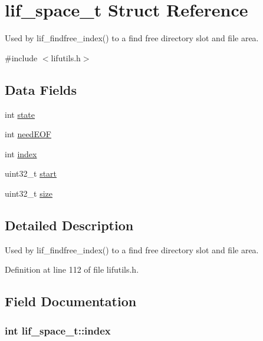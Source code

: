 \hypertarget{structlif__space__t}{}\section{lif\+\_\+space\+\_\+t Struct Reference}
\label{structlif__space__t}


Used by lif\+\_\+findfree\+\_\+index() to a find free directory slot and file area.  




{\ttfamily \#include $<$lifutils.\+h$>$}

\subsection*{Data Fields}
\begin{DoxyCompactItemize}
\item 
int \hyperlink{structlif__space__t_acc6b86db03a9c2b68f868bfabb350f42}{state}
\item 
int \hyperlink{structlif__space__t_abfeae53ab4c770b3a29cfb399243b24e}{need\+E\+OF}
\item 
int \hyperlink{structlif__space__t_a0e4777f2a1407539db0d5404e4f2d461}{index}
\item 
uint32\+\_\+t \hyperlink{structlif__space__t_a23b61454ad7e0d9b08019a4a65723dac}{start}
\item 
uint32\+\_\+t \hyperlink{structlif__space__t_a3175f877e02438340a5da584bbd8fed6}{size}
\end{DoxyCompactItemize}


\subsection{Detailed Description}
Used by lif\+\_\+findfree\+\_\+index() to a find free directory slot and file area. 

Definition at line 112 of file lifutils.\+h.



\subsection{Field Documentation}
\subsubsection[{\texorpdfstring{index}{index}}]{\setlength{\rightskip}{0pt plus 5cm}int lif\+\_\+space\+\_\+t\+::index}\hypertarget{structlif__space__t_a0e4777f2a1407539db0d5404e4f2d461}{}\label{structlif__space__t_a0e4777f2a1407539db0d5404e4f2d461}


